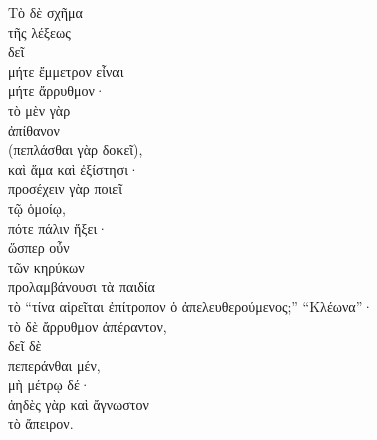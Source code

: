 {\large
\begin{greek}
\noindent Τὸ δὲ σχῆμα \\
\tabto{2em} τῆς λέξεως \\
\tabto{4em} δεῖ \\
\tabto{6em} μήτε ἔμμετρον εἶναι \\
\tabto{6em} μήτε ἄρρυθμον· \\
\tabto{8em} τὸ μὲν γὰρ \\
\tabto{10em} ἀπίθανον \\
\tabto{8em} (πεπλάσθαι γὰρ δοκεῖ), \\
\tabto{8em} καὶ ἅμα καὶ ἐξίστησι· \\
\tabto{8em} προσέχειν γὰρ ποιεῖ \\
\tabto{10em} τῷ ὁμοίῳ, \\
\tabto{10em} πότε πάλιν ἥξει· \\
\tabto{8em} ὥσπερ οὖν \\
\tabto{10em} τῶν κηρύκων \\
\tabto{12em} προλαμβάνουσι τὰ παιδία \\
\tabto{12em} τὸ “τίνα αἱρεῖται ἐπίτροπον ὁ ἀπελευθερούμενος;” “Κλέωνα”·\\
\tabto{8em} τὸ δὲ ἄρρυθμον ἀπέραντον, \\
\tabto{10em} δεῖ δὲ \\
\tabto{12em} πεπεράνθαι μέν, \\
\tabto{12em} μὴ μέτρῳ δέ·\\
\tabto{12em} ἀηδὲς γὰρ καὶ ἄγνωστον \\
\tabto{14em} τὸ ἄπειρον.\\

\end{greek}
}

